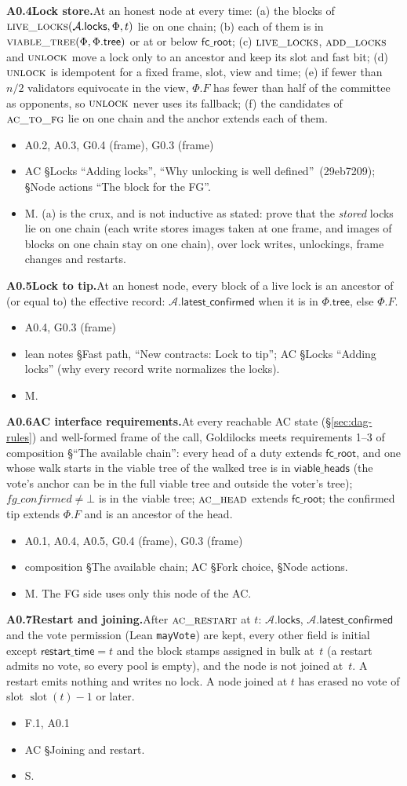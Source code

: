 \documentclass{article}
\newcommand{\slot}{\operatorname{slot}}
\newcommand{\AC}{\mathcal A}
\newcommand{\Fr}{\Phi}
\newcommand{\fcroot}{\mathsf{fc\_root}}
\newcommand{\allowed}{\mathsf{viable\_heads}}
\newcommand{\fname}[1]{\text{\textsc{#1}}}
\newcommand{\filtered}{\fname{viable\_tree}}
\newcommand{\latestConfirmed}{\mathsf{latest\_confirmed}}
\newcommand{\dagnode}[6]{%
\par\medskip\noindent\textbf{#1\enspace #2.}\enspace #3
\begin{itemize}[leftmargin=2.2em,itemsep=0pt,topsep=2pt]
\item[\emph{Uses}] #4
\item[\emph{Evid.}] #5
\item[\emph{Task}] #6
\end{itemize}}
\begin{document}
\dagnode{A0.4}{Lock store}{At an honest node at every time:
(a) the blocks of $\fname{live\_locks}(\AC.\mathsf{locks},\Fr,t)$ lie on one
chain; (b) each of them is in $\filtered(\Fr,\Fr.\mathsf{tree})$ or at or
below $\fcroot$; (c) $\fname{live\_locks}$, $\fname{add\_locks}$ and
$\fname{unlock}$ move a lock only to an ancestor and keep its slot and fast
bit; (d) $\fname{unlock}$ is idempotent for a fixed frame, slot, view and time;
(e) if fewer than $n/2$ validators equivocate in the view, $\Fr.F$ has
fewer than half of the committee as opponents, so $\fname{unlock}$ never
uses its fallback; (f) the candidates of $\fname{ac\_to\_fg}$
lie on one chain and the anchor extends each of them.}
{A0.2, A0.3, G0.4 (frame), G0.3 (frame)}{AC \S Locks ``Adding locks'', ``Why unlocking is well
defined''~(29eb7209); \S Node actions ``The block for the FG''.}{M.  (a) is the crux,
and is not inductive as stated: prove that the \emph{stored} locks lie on one
chain (each write stores images taken at one frame, and images of blocks on one
chain stay on one chain), over lock writes, unlockings, frame changes and
restarts.}

\dagnode{A0.5}{Lock to tip}{At an honest node, every block of a live lock is
an ancestor of (or equal to) the effective record: $\AC.\latestConfirmed$ when
it is in $\Fr.\mathsf{tree}$, else $\Fr.F$.}
{A0.4, G0.3 (frame)}{lean notes \S Fast path, ``New contracts: Lock to tip''; AC \S Locks
``Adding locks'' (why every record write normalizes the locks).}{M.}

\dagnode{A0.6}{AC interface requirements}{At every reachable AC state
(\S\ref{sec:dag-rules}) and well-formed frame of the call, Goldilocks meets
requirements 1--3 of composition \S``The available chain'':
every head of a duty extends $\fcroot$, and one whose walk starts in the
viable tree of the walked tree is in $\allowed$ (the vote's anchor can be in
the full viable tree and outside the voter's tree); $\mathit{fg\_confirmed}\neq\bot$ is in the
viable tree; $\fname{ac\_head}$ extends
$\fcroot$; the confirmed tip extends $\Fr.F$ and is an ancestor of the head.}
{A0.1, A0.4, A0.5, G0.4 (frame), G0.3 (frame)}{composition \S The available chain; AC \S Fork choice,
\S Node actions.}{M.  The FG side uses only this node of the AC.}

\dagnode{A0.7}{Restart and joining}{After $\fname{ac\_restart}$ at $t$:
$\AC.\mathsf{locks}$, $\AC.\latestConfirmed$ and the vote permission (Lean
\texttt{mayVote}) are kept, every other field is initial except $\mathsf{restart\_time}=t$ and the block stamps
assigned in bulk at~$t$ (a restart admits no vote, so every pool is
empty), and the
node is not joined at~$t$. A restart emits nothing and writes no lock.  A
node joined at $t$ has erased no vote of slot $\slot(t)-1$ or later.}
{F.1, A0.1}{AC \S Joining and restart.}{S.}
\end{document}

